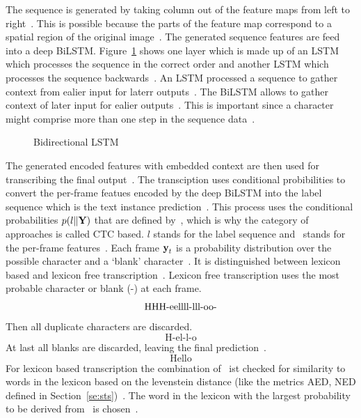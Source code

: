 The sequence is generated by taking column out of the feature maps from left to
right~\citep{shi_end--end_2017}.
This is possible because the parts of the feature map correspond to a spatial region of the
original image~\citep{shi_end--end_2017,goodfellow_deep_2016}.
The generated sequence features are feed into a deep \ac{BiLSTM}.
Figure~\ref{fig:bilstm} shows one layer which is made up of an \ac{LSTM} which processes the
sequence in the correct order and another \ac{LSTM} which processes the sequence
backwards~\citep{shi_end--end_2017}.
An \ac{LSTM} processed a sequence to gather context from ealier input for laterr
outputs~\citep{shi_end--end_2017,goodfellow_deep_2016}.
The \ac{BiLSTM} allows to gather context of later input for ealier outputs~\citep{shi_end--end_2017}.
This is important since a character might comprise more than one step in the sequence
data~\citep{shi_end--end_2017}.
\begin{figure}[ht]
    \centering
    \caption[Bidirectional LSTM]{%
        Bidirectional LSTM~\citep{goodfellow_deep_2016}\label{fig:bilstm}
    }
\end{figure}
The generated encoded features with embedded context are then used for transcribing the final
output~\citep{shi_end--end_2017}.
The transciption uses conditional probibilities to convert the per-frame featues encoded by the
deep \ac{BiLSTM} into the label sequence which is the text instance
prediction~\citep{shi_end--end_2017}.
This process uses the conditional probabilities $p(l\|\textbf{Y})$ that are defined
by~\cite{graves_connectionist_2006}, which is why the category of approaches is called
\ac{CTC} based.
$l$ stands for the label sequence and \Y\ stands for the per-frame features~\citep{shi_end--end_2017}.
Each frame $\textbf{y}_t$ is a probability distribution over the possible character and a `blank'
character~\citep{shi_end--end_2017,graves_connectionist_2006}.
It is distinguished between lexicon based and lexicon free transcription~\citep{shi_end--end_2017}.
Lexicon free transcription uses the most probable character or blank (-) at each frame.
\[\text{HHH-eellll-lll-\-oo-\-\-}\]
Then all duplicate characters are discarded.
\[\text{H-el-l-o}\]
At last all blanks are discarded, leaving the final prediction~\citep{shi_end--end_2017}.
\[\text{Hello}\]
For lexicon based transcription the combination of \Y\ ist checked for similarity to words in the
lexicon based on the levenstein distance (like the metrics \ac{AED}, \ac{NED} defined in
Section~\ref{se:sts})~\citep{shi_end--end_2017}.
The word in the lexicon with the largest probability to be derived from \Y\ is
chosen~\citep{shi_end--end_2017}.

